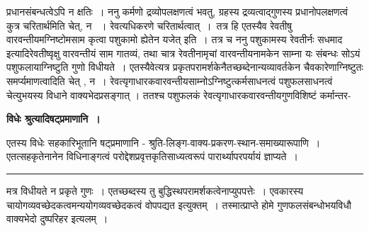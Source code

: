 \documentclass[11pt, openany]{book}
\begin{document}
प्रधानसंबन्धत्वेऽपि न क्षतिः~। {\br ननु} कर्मणो द्रव्योपलक्षणत्वं भवतु, ग्रहस्य द्रव्यत्वाद्गुणस्य प्रधानोपलक्षणत्वं कुत्र चरितार्थमिति चेत्, न ~। रेवत्यधिकरणे चरितार्थत्वात्~।~तत्र हि {\qt एतस्यैव रेवतीषु वारवन्तीयमग्निष्टोमसाम कृत्वा पशुकामो ह्येतेन यजेत्} इति~। तत्र च {\br ननु} पशुकामस्य {\qt रेवतीर्नः सधमाद} इत्यादिरेवतीष्वृक्षु वारवन्तीयं साम गातव्यं, तथा चात्र रेवतीनामृचां वारवन्तीयनामकेन साम्ना यः संबन्धः सोऽयं पशुफलायाग्निष्टुति गुणो विधीयते~। एतस्यैवेत्यत्र प्रकृतपरामर्शकेनैतच्छब्देनान्यव्यावर्तकेन चैवकारेणाग्निष्टुतः समर्प्यमाणत्वादिति चेत् , न~। रेवत्यृगाधारकवारवन्तीयसाम्नोऽग्निष्टुत्कर्मसाधनत्वं पशुफलसाधनत्वं चेत्युभयस्य विधाने वाक्यभेदप्रसङ्गात् । ततश्च पशुफलकं रेवत्यृगाधारकवारवन्तीयगुणविशिष्टं कर्मान्तर-
\newpage
\fancyhead[RE]{[विधेः श्रुत्यादि\textemdash\ }
 \begin{center}
     \textbf{विधेः श्रुत्यादिषट्प्रमाणानि~।~}
 \end{center} 

{\bl एतस्य विधेः सहकारिभूतानि {\al षट्प्रमाणानि - श्रुति-लिङ्ग-वाक्य-प्रकरण-स्थान-समाख्यारूपाणि~।} एतत्सहकृतेनानेन विधिनाङ्गत्वं परोद्देशप्रवृत्तकृतिसाध्यत्वरूपं
पारार्थ्यापरपर्यायं ज्ञाप्यते~।}\\
\hrule
\vspace{3mm}
\noindent
मत्र विधीयते न प्रकृते गुणः~। एतच्छब्दस्य तु बुद्धिस्थपरामर्शकत्वेनाप्युपपत्तेः~। एवकारस्य चायोगव्यवच्छेदकत्वमन्ययोगव्यवच्छेदकत्वं वोपपद्यत इत्युक्तम्~।
तस्मात्प्राप्ते होमे गुणफलसंबन्धोभयविधौ वाक्यभेदो दुष्परिहर इत्यलम्~।\\
\end{document}

